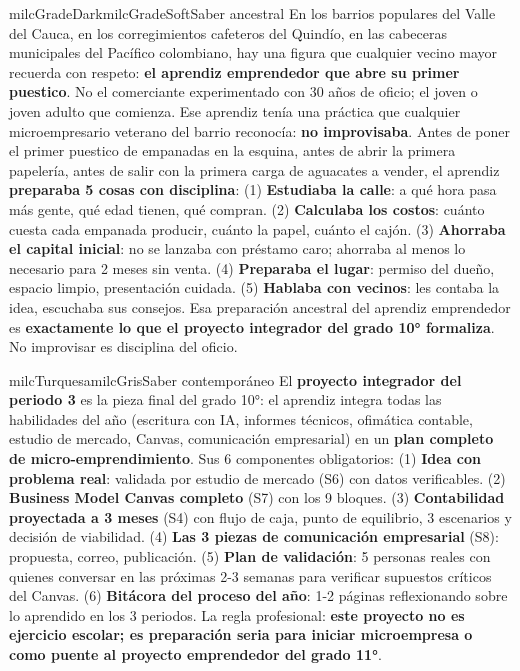 \documentclass[11pt,letterpaper]{article}
\begin{document}
\begin{softbox}{milcGradeDark}{milcGradeSoft}{Saber ancestral}
En los barrios populares del Valle del Cauca, en los corregimientos cafeteros del Quindío, en las cabeceras municipales del Pacífico colombiano, hay una figura que cualquier vecino mayor recuerda con respeto: \textbf{el aprendiz emprendedor que abre su primer puestico}. No el comerciante experimentado con 30 años de oficio; el joven o joven adulto que comienza. Ese aprendiz tenía una práctica que cualquier microempresario veterano del barrio reconocía: \textbf{no improvisaba}. Antes de poner el primer puestico de empanadas en la esquina, antes de abrir la primera papelería, antes de salir con la primera carga de aguacates a vender, el aprendiz \textbf{preparaba 5 cosas con disciplina}: (1) \textbf{Estudiaba la calle}: a qué hora pasa más gente, qué edad tienen, qué compran. (2) \textbf{Calculaba los costos}: cuánto cuesta cada empanada producir, cuánto la papel, cuánto el cajón. (3) \textbf{Ahorraba el capital inicial}: no se lanzaba con préstamo caro; ahorraba al menos lo necesario para 2 meses sin venta. (4) \textbf{Preparaba el lugar}: permiso del dueño, espacio limpio, presentación cuidada. (5) \textbf{Hablaba con vecinos}: les contaba la idea, escuchaba sus consejos. Esa preparación ancestral del aprendiz emprendedor es \textbf{exactamente lo que el proyecto integrador del grado 10° formaliza}. No improvisar es disciplina del oficio.
\end{softbox}

\begin{softbox}{milcTurquesa}{milcGris}{Saber contemporáneo}
El \textbf{proyecto integrador del periodo 3} es la pieza final del grado 10°: el aprendiz integra todas las habilidades del año (escritura con IA, informes técnicos, ofimática contable, estudio de mercado, Canvas, comunicación empresarial) en un \textbf{plan completo de micro-emprendimiento}. Sus 6 componentes obligatorios: (1) \textbf{Idea con problema real}: validada por estudio de mercado (S6) con datos verificables. (2) \textbf{Business Model Canvas completo} (S7) con los 9 bloques. (3) \textbf{Contabilidad proyectada a 3 meses} (S4) con flujo de caja, punto de equilibrio, 3 escenarios y decisión de viabilidad. (4) \textbf{Las 3 piezas de comunicación empresarial} (S8): propuesta, correo, publicación. (5) \textbf{Plan de validación}: 5 personas reales con quienes conversar en las próximas 2-3 semanas para verificar supuestos críticos del Canvas. (6) \textbf{Bitácora del proceso del año}: 1-2 páginas reflexionando sobre lo aprendido en los 3 periodos. La regla profesional: \textbf{este proyecto no es ejercicio escolar; es preparación seria para iniciar microempresa o como puente al proyecto emprendedor del grado 11°}.
\end{softbox}
\end{document}
